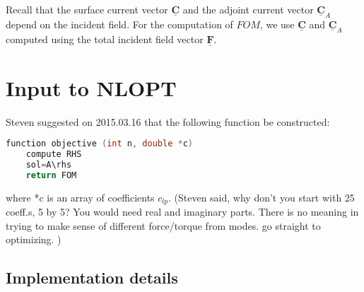 \documentclass[11pt,letterpaper]{article}
\newcommand{\Cvec}{\underline{\mathbf{C}}}
\newcommand{\Fvec}{\underline{\mathbf{F}}}
\begin{document}
\begin{multicols}{2}
Recall that the surface current vector $\Cvec$ and the adjoint current vector $\Cvec_A$ depend on the incident field. For the computation of $FOM$, we use $\Cvec$ and $\Cvec_A$ computed using the total incident field vector $\Fvec$. 

%
%
%

\end{multicols}
\clearpage
\section{Input to NLOPT}
Steven suggested on 2015.03.16 that the following function be constructed:

\begin{lstlisting}[language=C++,basicstyle=\scriptsize\ttfamily,
keywordstyle=\color{red},frame=single]
function objective (int n, double *c)
	compute RHS
	sol=A\rhs
	return FOM  
\end{lstlisting} 

where *c is an array of coefficients $c_{lp}$. (Steven said, why don't you start with 25 coeff.s, 5 by 5? You would need real and imaginary parts. There is no meaning in trying to make sense of different force/torque from modes. go straight to optimizing. )

\subsection{Implementation details}



\clearpage

%
\end{document}
